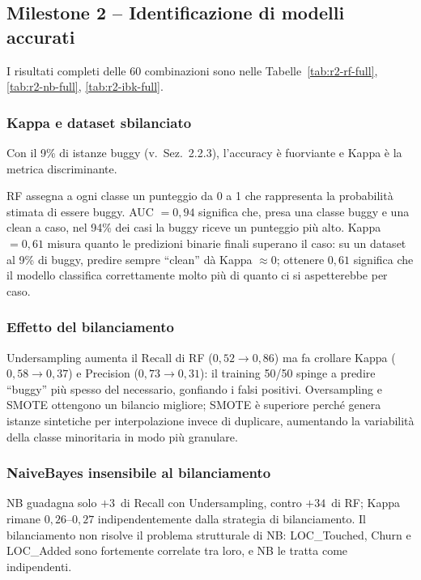 \subsection{Milestone 2 -- Identificazione di modelli accurati}

I risultati completi delle 60 combinazioni sono nelle Tabelle~\ref{tab:r2-rf-full},
\ref{tab:r2-nb-full}, \ref{tab:r2-ibk-full}.

\subsubsection{Kappa e dataset sbilanciato}

Con il 9\% di istanze buggy (v.\ Sez.~2.2.3), l'accuracy è fuorviante e Kappa
è la metrica discriminante.

RF assegna a ogni classe un punteggio da 0 a 1 che rappresenta la probabilità stimata
di essere buggy. AUC $= 0{,}94$ significa che, presa una classe buggy e una clean a
caso, nel 94\% dei casi la buggy riceve un punteggio più alto. Kappa $= 0{,}61$ misura
quanto le predizioni binarie finali superano il caso: su un dataset al 9\% di buggy,
predire sempre ``clean'' dà Kappa $\approx 0$; ottenere $0{,}61$ significa che il modello
classifica correttamente molto più di quanto ci si aspetterebbe per caso.

\subsubsection{Effetto del bilanciamento}

Undersampling aumenta il Recall di RF ($0{,}52 \to 0{,}86$) ma fa crollare Kappa
($0{,}58 \to 0{,}37$) e Precision ($0{,}73 \to 0{,}31$): il training 50/50 spinge a predire
``buggy'' più spesso del necessario, gonfiando i falsi positivi. Oversampling e SMOTE ottengono un
bilancio migliore; SMOTE è superiore perché genera istanze sintetiche per interpolazione
invece di duplicare, aumentando la variabilità della classe minoritaria in modo più granulare.

\subsubsection{NaiveBayes insensibile al bilanciamento}

NB guadagna solo $+3$\, di Recall con Undersampling, contro $+34$\, di RF; Kappa rimane
$0{,}26$--$0{,}27$ indipendentemente dalla strategia di bilanciamento. Il bilanciamento non risolve
il problema strutturale di NB: LOC\_Touched, Churn e LOC\_Added sono fortemente correlate
tra loro, e NB le tratta come indipendenti.

